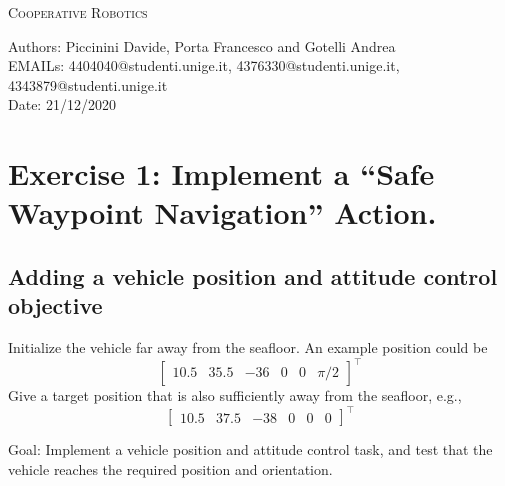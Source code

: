 \documentclass{article}
\makeatletter
\newcommand\frontmatter{%
    \cleardoublepage
  \pagenumbering{roman}}
\makeatother
\begin{document}
\frontmatter
\onecolumn
\vskip 1cm
\begin{center}
\huge \textsc{Cooperative Robotics}\\
\vskip 1cm

\skip 0.5cm

\vskip 5cm

\normalsize
Authors: Piccinini Davide, Porta Francesco and Gotelli Andrea \\
EMAILs: 4404040@studenti.unige.it, 4376330@studenti.unige.it, 4343879@studenti.unige.it \\
Date: 21/12/2020
\end{center}
\clearpage



\section{Exercise 1: Implement a “Safe Waypoint Navigation” Action.}

\subsection{Adding a vehicle position and attitude control objective}
Initialize the vehicle far away from the seafloor. An example position could be
\begin{displaymath}
\begin{bmatrix} 10.5 & 35.5 & -36 & 0 & 0 & \pi/2\end{bmatrix}^\top
\end{displaymath} 
Give a target position that is also sufficiently away from the seafloor, e.g.,
\begin{displaymath}
\begin{bmatrix} 10.5 & 37.5 & -38 & 0 & 0 & 0 \end{bmatrix}^\top
\end{displaymath}

Goal: Implement a vehicle position and attitude control task, and test that the vehicle reaches the required position and orientation.
\end{document}

